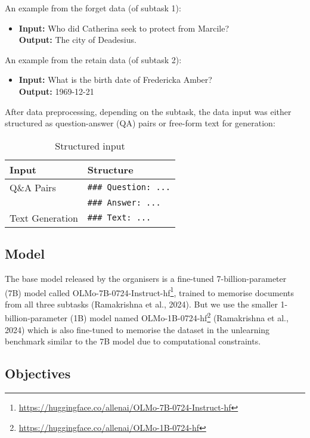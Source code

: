 \documentclass[11pt]{article}
\begin{document}
An example from the forget data (of subtask 1):
\begin{itemize}
    \item \textbf{Input:} Who did Catherina seek to protect from Marcile? \\
    \textbf{Output:} The city of Deadesius.
\end{itemize}

An example from the retain data (of subtask 2):
\begin{itemize}
    \item \textbf{Input:} What is the birth date of Fredericka Amber? \\
    \textbf{Output:} 1969-12-21
\end{itemize}

After data preprocessing, depending on the subtask, the data input was either structured as question-answer (QA) pairs or free-form text for generation:

\begin{table}[h]
    \centering
    \begin{tabular}{l|l} 
        \hline
        \textbf{Input} & \textbf{Structure} \\ 
        \hline
        Q\&A Pairs & \texttt{\#\#\# Question: ...} \\
         & \texttt{\#\#\# Answer: ...} \\ 
        \hline
        Text Generation & \texttt{\#\#\# Text: ...} \\ 
        \hline
    \end{tabular}
    \caption{Structured input}
    \label{tab:input_structure}
\end{table}


\subsection*{Model}
The base model released by the organisers is a fine-tuned 7-billion-parameter (7B) model called OLMo-7B-0724-Instruct-hf\footnote{\url{https://huggingface.co/allenai/OLMo-7B-0724-Instruct-hf}}, trained to memorise documents from all three subtasks (Ramakrishna et al., 2024). But we use the smaller 1-billion-parameter (1B) model named OLMo-1B-0724-hf\footnote{\url{https://huggingface.co/allenai/OLMo-1B-0724-hf}} (Ramakrishna et al., 2024) which is also fine-tuned to memorise the dataset in the unlearning benchmark similar to the 7B model due to computational constraints.

\subsection*{Objectives}
\end{document}

